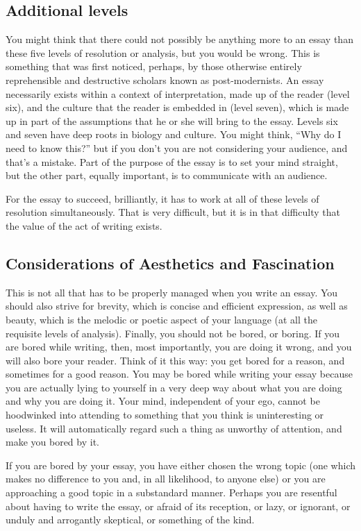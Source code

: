 \documentclass{article}
\begin{document}
\subsection{Additional levels}

You might think that there could not possibly be anything more to an
essay than these five levels of resolution or analysis, but you would be
wrong. This is something that was first noticed, perhaps, by those
otherwise entirely reprehensible and destructive scholars known as
post-modernists. An essay necessarily exists within a context of
interpretation, made up of the reader (level six), and the culture that
the reader is embedded in (level seven), which is made up in part of the
assumptions that he or she will bring to the essay. Levels six and seven
have deep roots in biology and culture. You might think, ``Why do I need
to know this?'' but if you don't you are not considering your audience,
and that's a mistake. Part of the purpose of the essay is to set your
mind straight, but the other part, equally important, is to communicate
with an audience.

For the essay to succeed, brilliantly, it has to work at all of these
levels of resolution simultaneously. That is very difficult, but it is
in that difficulty that the value of the act of writing exists.

\subsection{Considerations of Aesthetics and Fascination}

This is not all that has to be properly managed when you write an essay.
You should also strive for brevity, which is concise and efficient
expression, as well as beauty, which is the melodic or poetic aspect of
your language (at all the requisite levels of analysis). Finally, you
should not be bored, or boring. If you are bored while writing, then,
most importantly, you are doing it wrong, and you will also bore your
reader. Think of it this way: you get bored for a reason, and sometimes
for a good reason. You may be bored while writing your essay because you
are actually lying to yourself in a very deep way about what you are
doing and why you are doing it. Your mind, independent of your ego,
cannot be hoodwinked into attending to something that you think is
uninteresting or useless. It will automatically regard such a thing as
unworthy of attention, and make you bored by it.

If you are bored by your essay, you have either chosen the wrong topic
(one which makes no difference to you and, in all likelihood, to anyone
else) or you are approaching a good topic in a substandard manner.
Perhaps you are resentful about having to write the essay, or afraid of
its reception, or lazy, or ignorant, or unduly and arrogantly skeptical,
or something of the kind.
\end{document}
